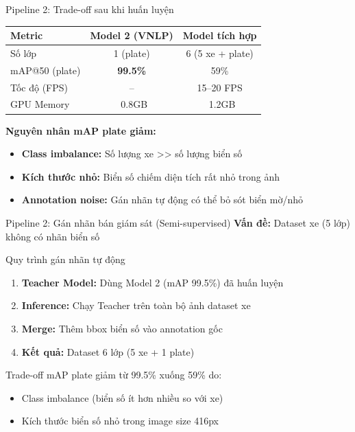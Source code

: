 \begin{frame}{Pipeline 2: Trade-off sau khi huấn luyện}
    \begin{table}
        \centering
        \small
        \begin{tabular}{|l|c|c|}
            \hline
            \textbf{Metric} & \textbf{Model 2 (VNLP)} & \textbf{Model tích hợp} \\
            \hline
            Số lớp & 1 (plate) & 6 (5 xe + plate) \\
            \hline
            mAP@50 (plate) & \textbf{99.5\%} & 59\% \\
            \hline
            Tốc độ (FPS) & -- & 15--20 FPS \\
            \hline
            GPU Memory & ~0.8GB & ~1.2GB \\
            \hline
        \end{tabular}
    \end{table}

    \textbf{Nguyên nhân mAP plate giảm:}
    \begin{itemize}
        \item \textbf{Class imbalance:} Số lượng xe >> số lượng biển số
        \item \textbf{Kích thước nhỏ:} Biển số chiếm diện tích rất nhỏ trong ảnh
        \item \textbf{Annotation noise:} Gán nhãn tự động có thể bỏ sót biển mờ/nhỏ
    \end{itemize}
\end{frame}

\begin{frame}{Pipeline 2: Gán nhãn bán giám sát (Semi-supervised)}
    \textbf{Vấn đề:} Dataset xe (5 lớp) không có nhãn biển số

    \begin{block}{Quy trình gán nhãn tự động}
    \begin{enumerate}
        \item \textbf{Teacher Model:} Dùng Model 2 (mAP 99.5\%) đã huấn luyện
        \item \textbf{Inference:} Chạy Teacher trên toàn bộ ảnh dataset xe
        \item \textbf{Merge:} Thêm bbox biển số vào annotation gốc
        \item \textbf{Kết quả:} Dataset 6 lớp (5 xe + 1 plate)
    \end{enumerate}
    \end{block}

    \begin{alertblock}{Trade-off}
    mAP plate giảm từ 99.5\% xuống 59\% do:
    \begin{itemize}
        \item Class imbalance (biển số ít hơn nhiều so với xe)
        \item Kích thước biển số nhỏ trong image size 416px
    \end{itemize}
    \end{alertblock}
\end{frame}

